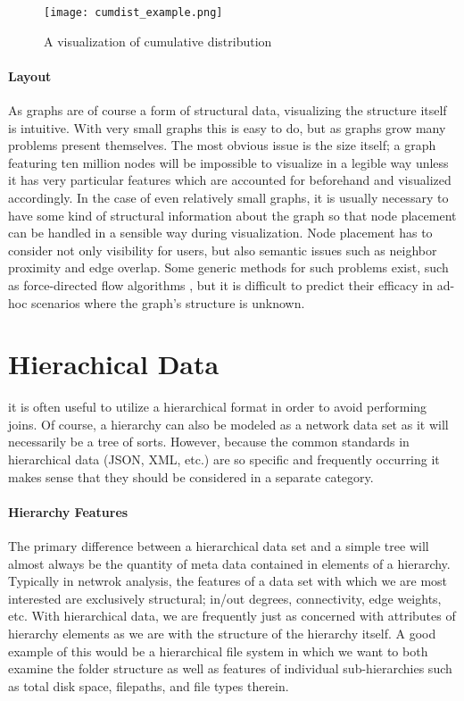 \begin{figure}
	\centering
	\texttt{[image: cumdist\_example.png]}
	\caption{A visualization of cumulative distribution \cite{KONECT}}
	\label{fig:cumdist}
\end{figure}

\paragraph{Layout}
As graphs are of course a form of structural data, visualizing the structure itself is intuitive. With very small graphs this is easy to do, but as graphs grow many problems present themselves. The most obvious issue is the size itself; a graph featuring ten million nodes will be impossible to visualize in a legible way unless it has very particular features which are accounted for beforehand and visualized accordingly. In the case of even relatively small graphs, it is usually necessary to have some kind of structural information about the graph so that node placement can be handled in a sensible way during visualization. Node placement has to consider not only visibility for users, but also semantic issues such as neighbor proximity and edge overlap. Some generic methods for such problems exist, such as force-directed flow algorithms \cite{Didimo2011}, but it is difficult to predict their efficacy in ad-hoc scenarios where the graph's structure is unknown.
 

\section{Hierachical Data}
\label{sec:hierarchical}
 it is often useful to utilize a hierarchical format in order to avoid performing joins. Of course, a hierarchy can also be modeled as a network data set as it will necessarily be a tree of sorts. However, because the common standards in hierarchical data (JSON, XML, etc.) are so specific and frequently occurring it makes sense that they should be considered in a separate category.

\paragraph{Hierarchy Features}
The primary difference between a hierarchical data set and a simple tree will almost always be the quantity of meta data contained in elements of a hierarchy. Typically in netwrok analysis, the features of a data set with which we are most interested are exclusively structural; in/out degrees, connectivity, edge weights, etc. With hierarchical data, we are frequently just as concerned with attributes of hierarchy elements as we are with the structure of the hierarchy itself. A good example of this would be a hierarchical file system in which we want to both examine the folder structure as well as features of individual sub-hierarchies such as total disk space, filepaths, and file types therein. 

